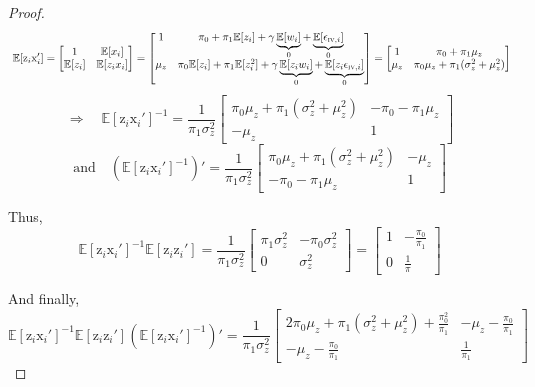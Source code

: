 \documentclass[a4paper, 11pt]{report}
\begin{document}
\begin{proof}
			\[ 
				\mathbb{E}[\text{z}_{i}\text{x}_i'] 
				=
				\begin{bmatrix}
					1 & \mathbb{E}[x_{i}]\\ 
					\mathbb{E}[z_{i}] & \mathbb{E}[z_{i}x_{i}]
				\end{bmatrix} 
				=
				\begin{bmatrix}
					1 & \pi_0 + \pi_1 \mathbb{E}[z_{i}] + \gamma \underbrace{\mathbb{E}[w_{i}]}_{0} + \underbrace{\mathbb{E}[\epsilon_{\textsc{iv}, i}]}_{0}\\ 
					\mu_{z} & \pi_0 \mathbb{E}[z_{i}] + \pi_1 \mathbb{E}[z_{i}^{2}] + \gamma \underbrace{\mathbb{E}[z_{i}w_{i}]}_{0} + \underbrace{\mathbb{E}[z_{i}\epsilon_{\textsc{iv}, i}]}_{0}
				\end{bmatrix} =
				\begin{bmatrix}
					1 & \pi_0 + \pi_1 \mu_{z}\\ 
					\mu_{z} & \pi_0\mu_z + \pi_1 (\sigma_{z}^{2} + \mu_{z}^{2})
				\end{bmatrix} 
			\]
			\[
				 \Rightarrow \quad
				     \mathbb{E}[\text{z}_{i}\text{x}_i']^{-1} = \dfrac{1}{\pi_1 \sigma_{z}^{2}} 
				     			\begin{bmatrix}
								 \pi_0 \mu_z + \pi_1 (\sigma_{z}^{2} + \mu_{z}^{2})& - \pi_0 - \pi_1 \mu_{z}\\ 
								 -\mu_{z} & 1
							\end{bmatrix} 
			\]
			\[
				 \text{and} \quad
					  \left( \mathbb{E}[\text{z}_{i}\text{x}_i']^{-1} \right)' = \dfrac{1}{\pi_1 \sigma_{z}^{2}} 
				     			\begin{bmatrix}
								 \pi_0 \mu_z + \pi_1 (\sigma_{z}^{2} + \mu_{z}^{2})& -\mu_{z}\\ 
								  - \pi_0 - \pi_1 \mu_{z} & 1
							\end{bmatrix} 
			\]
			
		Thus, 
			\[
				     \mathbb{E}[\text{z}_{i}\text{x}_i']^{-1}\mathbb{E}[\text{z}_{i}\text{z}_i']  
				     		= \dfrac{1}{\pi_1 \sigma_{z}^{2}} 
				     			\begin{bmatrix}
								\pi_1 \sigma_{z}^{2} & -\pi_0 \sigma_z^{2}\\ 
								 0 & \sigma_{z}^{2}
							\end{bmatrix} 
						=
						\begin{bmatrix}
							1 & -\frac{\pi_0}{\pi_1}\\ 
							 0 & \frac{1}{\pi}
						\end{bmatrix} 
			\]
		
		And finally, 
			\[
				     \mathbb{E}[\text{z}_{i}\text{x}_i']^{-1}\mathbb{E}[\text{z}_{i}\text{z}_i']  \left( \mathbb{E}[\text{z}_{i}\text{x}_i']^{-1} \right)' 
				     		= \dfrac{1}{\pi_1 \sigma_{z}^{2}} 
				     			\begin{bmatrix}
								2 \pi_0 \mu_z + \pi_1(\sigma_{z}^{2} + \mu_{z}^{2}) + \frac{\pi_0^2}{\pi_1}&   -\mu_{z} -  \frac{\pi_0}{\pi_1} \\ 
								  -\mu_{z} -  \frac{\pi_0}{\pi_1} & \frac{1}{\pi_1}
							\end{bmatrix} 
			\]
			

\end{proof}
\end{document}
